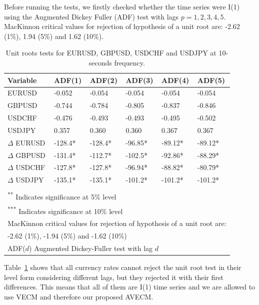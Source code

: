 Before running the tests, we firstly checked whether the time series were
I(1) using the Augmented Dickey Fuller (ADF) test with lags $p=1,2,3,4,5$. 
MacKinnon \cite{mackinnon2010} critical values for rejection of hypothesis of a unit root are: -2.62 (1\%), 1.94 (5\%) and 1.62 (10\%).
\begin{table}[ht]
\label{tab:adf}
\centering
\begin{tabular}{llllll}
\toprule
{Variable} & {ADF(1)} & {ADF(2)} & {ADF(3)} & {ADF(4)} & {ADF(5)}\\ 
\midrule
EURUSD &  -0.052   & -0.054  & -0.054  & -0.054  & -0.054  \\
GBPUSD &  -0.744  & -0.784  & -0.805  & -0.837  & -0.846  \\
USDCHF &  -0.476   & -0.493  & -0.493  & -0.495  & -0.502  \\
USDJPY &  0.357   & 0.360  & 0.360  & 0.367  & 0.367  \\
$\Delta$ EURUSD & -128.4*  & -128.4*  & -96.85* & -89.12*   & -89.12*\\
$\Delta$ GBPUSD & -131.4*  & -112.7*  & -102.5* & -92.86*   & -88.29*\\
$\Delta$ USDCHF & -127.8*  & -127.8*  & -96.94* & -88.82*   & -80.79*\\
$\Delta$ USDJPY & -135.1*  & -135.1*  & -101.2* & -101.2*   & -101.2*\\
\bottomrule
\addlinespace[1ex]
\multicolumn{6}{l}{ \textsuperscript{*} Indicates significance at 1\% level} \\
\multicolumn{6}{l}{ \textsuperscript{**} Indicates significance at 5\% level} \\
\multicolumn{6}{l}{ \textsuperscript{***} Indicates significance at 10\% level} \\
\multicolumn{6}{l}{MacKinnon critical values for rejection of hypothesis of a unit root are:}\\
\multicolumn{6}{l}{ -2.62 (1\%), -1.94 (5\%) and -1.62 (10\%)}\\
\multicolumn{6}{l}{ADF($d$) Augmented Dickey-Fuller test with lag $d$} 
\end{tabular}
\caption{Unit roots tests for EURUSD, GBPUSD, USDCHF and USDJPY at 10-seconds
frequency.}
\end{table}
Table~\ref{tab:adf} shows that all currency rates cannot reject the unit root test in their level form considering different lags, but they rejected it with their first differences. This means that all of
them are I(1) time series and we are allowed to use VECM and therefore our proposed AVECM.

